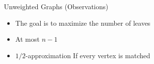 \begin{frame}{Unweighted Graphs (Observations)}
\begin{itemize}
  \item The goal is to maximize the number of leaves
  \item At most $n - 1$
  \item $1/2$-approximation If every vertex is matched 
\end{itemize}
\end{frame}